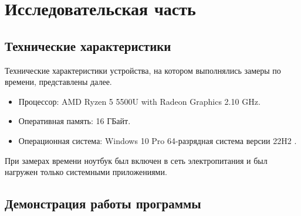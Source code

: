 \chapter{Исследовательская часть}

\section{Технические характеристики}

Технические характеристики устройства, на котором выполнялись замеры по времени, представлены далее.

\begin{itemize}
	\item Процессор: AMD Ryzen 5 5500U with Radeon Graphics 2.10 GHz.
	\item Оперативная память: 16 ГБайт.
	\item Операционная система: Windows 10 Pro 64-разрядная система версии 22H2 \cite{windows}.
\end{itemize}

При замерах времени ноутбук был включен в сеть электропитания и был нагружен только системными приложениями.

\section{Демонстрация работы программы}

